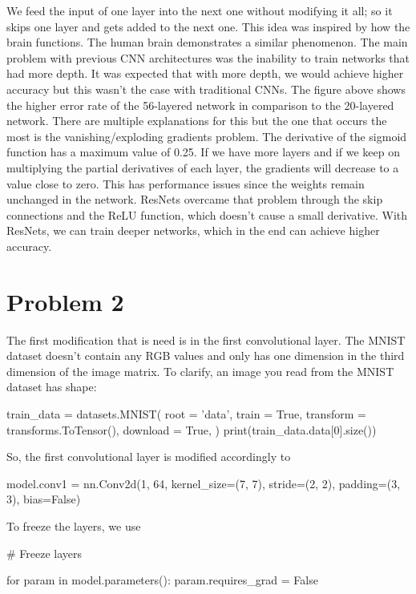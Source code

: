\documentclass{article}
\numberwithin{equation}{section}
\numberwithin{equation}{section}
\begin{document}
We feed the input of one layer into the next one without modifying it all; so it skips one layer and gets added to the next one. This idea was inspired by how the brain functions. The human brain demonstrates a similar phenomenon. The main problem with previous CNN architectures was the inability to train networks that had more depth. It was expected that with more depth, we would achieve higher accuracy but this wasn't the case with traditional CNNs. The figure above shows the higher error rate of the 56-layered network in comparison to the 20-layered network. There are multiple explanations for this but the one that occurs the most is the vanishing/exploding gradients problem. The derivative of the sigmoid function has a maximum value of 0.25. If we have more layers and if we keep on multiplying the partial derivatives of each layer, the gradients will decrease to a value close to zero. This has performance issues since the weights remain unchanged in the network. ResNets overcame that problem through the skip connections and the ReLU function, which doesn't cause a small derivative. With ResNets, we can train deeper networks, which in the end can achieve higher accuracy.





\section{Problem 2}
The first modification that is need is in the first convolutional layer. The MNIST dataset doesn't contain any RGB values and only has one dimension in the third dimension of the image matrix. To clarify, an image you read from the MNIST dataset has shape:
\begin{python}
train_data = datasets.MNIST(
    root = 'data',
    train = True,                         
    transform = transforms.ToTensor(), 
    download = True,            
)
print(train_data.data[0].size())

\end{python}
So, the first convolutional layer is modified accordingly to 

\begin{python}
model.conv1 = nn.Conv2d(1, 64, kernel_size=(7, 7), stride=(2, 2), padding=(3, 3), bias=False)
\end{python}

To freeze the layers, we use 

\begin{python}
# Freeze layers

for param in model.parameters():
    param.requires_grad = False
\end{python}
\end{document}
